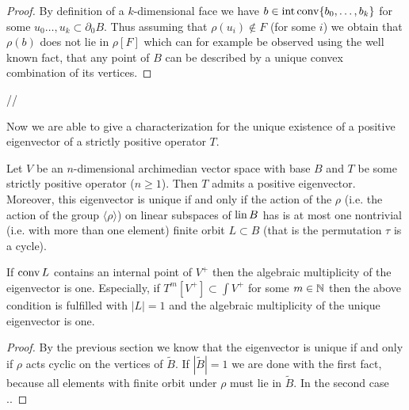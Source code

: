 \documentclass{article}
\begin{document}
\begin{proof}
By definition of a $k$-dimensional face we have $b\in\text{int}\operatorname{conv}\{b_0,\ldots,b_k\}$ for some $u_0\ldots,u_k\subset \partial_0 B$. Thus assuming that $\rho(u_i)\not\in F$ (for some $i$) we obtain that $\rho(b)$ does not lie in $\rho[F]$ which can for example be observed using the well known fact, that any point of $B$ can be described by a unique convex combination of its vertices.
\end{proof}
//

Now we are able to give a characterization for the unique existence of a positive eigenvector of a strictly positive operator $T$.

\begin{theorem}
Let $V$ be an $n$-dimensional archimedian vector space with base $B$ and $T$ be some strictly positive operator ($n\geq 1$). 
Then $T$ admits a positive eigenvector. 
Moreover, this eigenvector is unique if and only if the action of the $\rho$ (i.e. the action of the group $\langle \rho\rangle$) on linear subspaces of $\operatorname{lin} B$ has is at most one nontrivial (i.e. with more than one element) finite orbit $L\subset B$ (that is the permutation $\tau$ is a cycle). 

If $\operatorname{conv} L$ contains an internal point of $V^+$ then the algebraic multiplicity of the eigenvector is one.
Especially, if $T^m[V^+]\subset\int V^+$ for some $m\in\mathbb{N}$ then the above condition is fulfilled with $|L|=1$ and the algebraic multiplicity of the unique eigenvector is one. 
\end{theorem}

\begin{proof}
By the previous section we know that the eigenvector is unique if and only if $\rho$ acts cyclic on the vertices of $\tilde{B}$. If $|\tilde{B}|=1$ we are done with the first fact, because all elements with finite orbit under $\rho$ must lie in $\tilde{B}$. In the second case ..
\end{proof}
\end{document}
